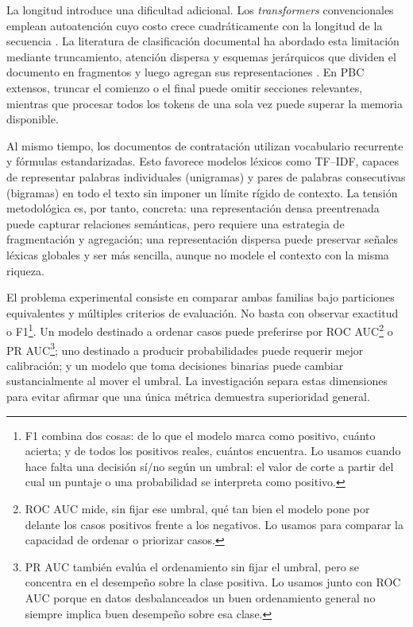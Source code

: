 La longitud introduce una dificultad adicional. Los \textit{transformers} convencionales emplean autoatención cuyo costo crece cuadráticamente con la longitud de la secuencia \parencite{vaswani2017attention}. La literatura de clasificación documental ha abordado esta limitación mediante truncamiento, atención dispersa y esquemas jerárquicos que dividen el documento en fragmentos y luego agregan sus representaciones \parencite{beltagy2020longformer,dai2022revisiting}. En PBC extensos, truncar el comienzo o el final puede omitir secciones relevantes, mientras que procesar todos los tokens de una sola vez puede superar la memoria disponible.

Al mismo tiempo, los documentos de contratación utilizan vocabulario recurrente y fórmulas estandarizadas. Esto favorece modelos léxicos como TF--IDF, capaces de representar palabras individuales (unigramas) y pares de palabras consecutivas (bigramas) en todo el texto sin imponer un límite rígido de contexto. La tensión metodológica es, por tanto, concreta: una representación densa preentrenada puede capturar relaciones semánticas, pero requiere una estrategia de fragmentación y agregación; una representación dispersa puede preservar señales léxicas globales y ser más sencilla, aunque no modele el contexto con la misma riqueza.

El problema experimental consiste en comparar ambas familias bajo particiones equivalentes y múltiples criterios de evaluación. No basta con observar exactitud o F1\footnote{F1 combina dos cosas: de lo que el modelo marca como positivo, cuánto acierta; y de todos los positivos reales, cuántos encuentra. Lo usamos cuando hace falta una decisión sí/no según un umbral: el valor de corte a partir del cual un puntaje o una probabilidad se interpreta como positivo.}. Un modelo destinado a ordenar casos puede preferirse por ROC AUC\footnote{ROC AUC mide, sin fijar ese umbral, qué tan bien el modelo pone por delante los casos positivos frente a los negativos. Lo usamos para comparar la capacidad de ordenar o priorizar casos.} o PR AUC\footnote{PR AUC también evalúa el ordenamiento sin fijar el umbral, pero se concentra en el desempeño sobre la clase positiva. Lo usamos junto con ROC AUC porque en datos desbalanceados un buen ordenamiento general no siempre implica buen desempeño sobre esa clase.}; uno destinado a producir probabilidades puede requerir mejor calibración; y un modelo que toma decisiones binarias puede cambiar sustancialmente al mover el umbral. La investigación separa estas dimensiones para evitar afirmar que una única métrica demuestra superioridad general.

